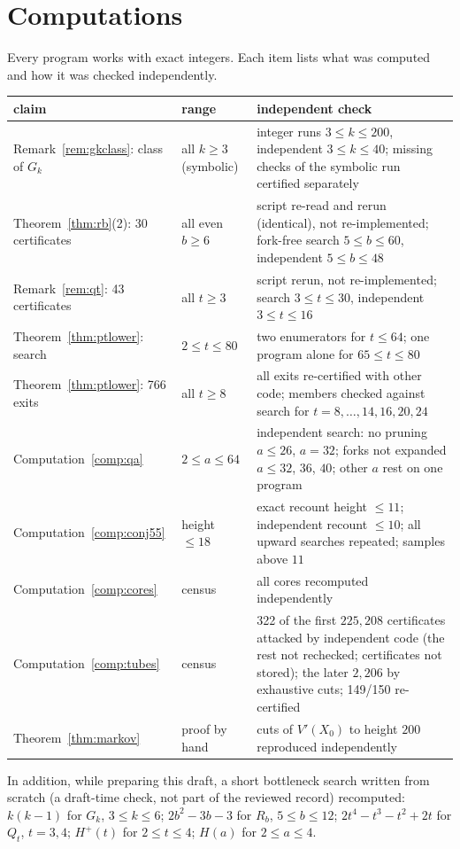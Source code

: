 \documentclass[11pt]{amsart}
\theoremstyle{definition}
\theoremstyle{remark}
\newcommand{\Vp}{V'}
\begin{document}
\section{Computations}\label{app:comp}
Every program works with exact integers. Each item lists what was computed and how it was checked independently.
\begin{center}\small
\begin{tabular}{p{}p{}p{}}
\toprule
claim & range & independent check\\
\midrule
Remark~\ref{rem:gkclass}: class of $G_k$ & all $k\ge3$ (symbolic) & integer runs $3\le k\le200$, independent $3\le k\le40$; missing checks of the symbolic run certified separately\\
Theorem~\ref{thm:rb}(2): 30 certificates & all even $b\ge6$ & script re-read and rerun (identical), not re-implemented; fork-free search $5\le b\le60$, independent $5\le b\le48$\\
Remark~\ref{rem:qt}: 43 certificates & all $t\ge3$ & script rerun, not re-implemented; search $3\le t\le30$, independent $3\le t\le16$\\
Theorem~\ref{thm:ptlower}: search & $2\le t\le80$ & two enumerators for $t\le64$; one program alone for $65\le t\le80$\\
Theorem~\ref{thm:ptlower}: 766 exits & all $t\ge8$ & all exits re-certified with other code; members checked against search for $t=8,\dots,14,16,20,24$\\
Computation~\ref{comp:qa} & $2\le a\le64$ & independent search: no pruning $a\le26$, $a=32$; forks not expanded $a\le32$, $36$, $40$; other $a$ rest on one program\\
Computation~\ref{comp:conj55} & height $\le18$ & exact recount height $\le11$; independent recount $\le10$; all upward searches repeated; samples above $11$\\
Computation~\ref{comp:cores} & census & all cores recomputed independently\\
Computation~\ref{comp:tubes} & census & 322 of the first $225{,}208$ certificates attacked by independent code (the rest not rechecked; certificates not stored); the later $2{,}206$ by exhaustive cuts; 149/150 re-certified\\
Theorem~\ref{thm:markov} & proof by hand & cuts of $\Vp(X_0)$ to height $200$ reproduced independently\\
\bottomrule
\end{tabular}
\end{center}
In addition, while preparing this draft, a short bottleneck search written from scratch (a draft-time check, not part of the reviewed record) recomputed: $k(k-1)$ for $G_k$, $3\le k\le6$; $2b^2-3b-3$ for $R_b$, $5\le b\le12$; $2t^4-t^3-t^2+2t$ for $Q_t$, $t=3,4$; $H^+(t)$ for $2\le t\le4$; $H(a)$ for $2\le a\le4$.
\end{document}
